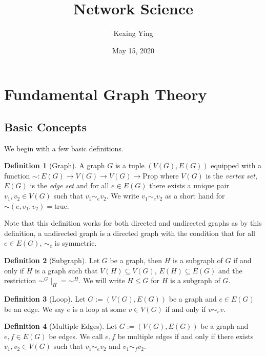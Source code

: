 \documentclass[
]{article}
\title{Network Science}
\author{Kexing Ying}
\date{May 15, 2020}
\theoremstyle{definition}
\theoremstyle{definition}
\newtheorem{definition}{Definition}[section]
\begin{document}
\maketitle

{
\hypersetup{linkcolor=}
\setcounter{tocdepth}{2}
\tableofcontents
}
\newpage

\hypertarget{fundamental-graph-theory}{%
\section{Fundamental Graph Theory}\label{fundamental-graph-theory}}

\hypertarget{basic-concepts}{%
\subsection{Basic Concepts}\label{basic-concepts}}

We begin with a few basic definitions.

\begin{definition}[Graph]
  A graph \(G\) is a tuple \((V(G), E(G))\) equipped with a function 
  \(\sim : E(G) \to V(G) \to V(G) \to \text{Prop}\) where \(V(G)\) is the 
  \textit{vertex set}, \(E(G)\) is the \textit{edge set} and for all 
  \(e \in E(G)\) there exists a unique pair \(v_1, v_2 \in V(G)\) such that 
  \(v_1 \sim_e v_2\). We write \(v_1 \sim_e v_2\) as a short hand for 
  \(\sim(e, v_1, v_2) = \text{true}\).
\end{definition}

Note that this definition works for both directed and undirected graphs
as by this definition, a undirected graph is a directed graph with the
condition that for all \(e \in E(G)\), \(\sim_e\) is symmetric.

\begin{definition}[Subgraph]
  Let \(G\) be a graph, then \(H\) is a subgraph of \(G\) if and only if \(H\) 
  is a graph such that \(V(H) \subseteq V(G)\), \(E(H) \subseteq E(G)\) and the 
  restriction \(\sim^G\mid_H = \sim^H\). We will write \(H \le G\) for \(H\) is 
  a subgraph of \(G\).
\end{definition}

\begin{definition}[Loop]
  Let \(G := (V(G), E(G))\) be a graph and \(e \in E(G)\) be an edge. We say 
  \(e\) is a loop at some \(v \in V(G)\) if and only if \(v \sim_e v\).
\end{definition}

\begin{definition}[Multiple Edges] 
  Let \(G := (V(G), E(G))\) be a graph and \(e, f \in E(G)\) be edges. We call 
  \(e, f\) be multiple edges if and only if there exists \(v_1, v_2 \in V(G)\) 
  such that \(v_1 \sim_e v_2\) and \(v_1 \sim_f v_2\).
\end{definition}
\end{document}
